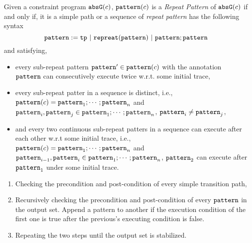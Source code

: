 \begin{defn}
  Given a constraint program $\mathtt{abs}{\mathtt{G}}(c)$,
  $\mathtt{pattern}(c)$ is a \emph{Repeat Pattern} of $\mathtt{abs}{\mathtt{G}}(c)$ if and only if, it is a simple path or
  a sequence of \emph{repeat pattern}
  has the following syntax
  \[
    \mathtt{pattern} := \mathtt{tp} ~|~ \mathtt{repreat}(\mathtt{pattern}) ~|~ \mathtt{pattern}; \mathtt{pattern}
  \] 
  and satisfying,
  \begin{itemize}
  \item every sub-repeat pattern $\mathtt{pattern}' \in \mathtt{pattern}(c)$ with the annotation $\mathtt{pattern}$
  can consecutively execute twice
  w.r.t. some initial trace,
  \item every sub-repeat patter in a sequence is distinct, i.e., $\mathtt{pattern}(c) = \mathtt{pattern}_1; \cdots; \mathtt{pattern}_n$ and 
  $\mathtt{pattern}_i, \mathtt{pattern}_j \in \mathtt{pattern}_1; \cdots; \mathtt{pattern}_n$, $\mathtt{pattern}_i \neq \mathtt{pattern}_j$,
  \item and every two continuous sub-repeat patters in a sequence can execute after each other w.r.t some initial trace,
  i.e., $\mathtt{pattern}(c) = \mathtt{pattern}_1; \cdots; \mathtt{pattern}_n$ and 
  $\mathtt{pattern}_{i - 1}, \mathtt{pattern}_{i} \in \mathtt{pattern}_1; \cdots; \mathtt{pattern}_n$, 
  $\mathtt{pattern}_2$ can execute after $\mathtt{pattern}_1$ under some initial trace.
  \end{itemize}
\end{defn}
%
\begin{enumerate}
  \item Checking the precondition and post-condition of every simple transition path,
  \item 
Recursively checking the precondition and post-condition of every $\mathtt{pattern}$ in the output set.
Append a pattern to another if the execution condition of the first one
is true after the previous's executing condition is false.
\item Repeating the two steps until the output set is stabilized.
\end{enumerate}

